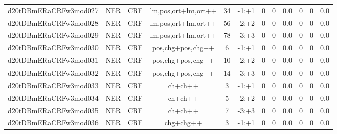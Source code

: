 \documentclass[a4paper]{article}
\begin{document}
\begin{landscape}
\begin{center}
\begin{tabular}{ |c|c|c|c|c|c|c|c|c|c|c|c|}
 
 	
 	\small{ d20tDBmERaCRFw3mod027 } & \small{ NER} & \small{  CRF }  & lm,pos,ort+lm,ort++  &  34 &  \small{  -1:+1 }  &  0 & 0 & 0.0  &  0 & 0 & 0.0 \\
 	

 
 	
 	\small{ d20tDBmERaCRFw3mod028 } & \small{ NER} & \small{  CRF }  & lm,pos,ort+lm,ort++  &  56 &  \small{  -2:+2 }  &  0 & 0 & 0.0  &  0 & 0 & 0.0 \\
 	

 
 	
 	\small{ d20tDBmERaCRFw3mod029 } & \small{ NER} & \small{  CRF }  & lm,pos,ort+lm,ort++  &  78 &  \small{  -3:+3 }  &  0 & 0 & 0.0  &  0 & 0 & 0.0 \\
 	

 
 	
 	\small{ d20tDBmERaCRFw3mod030 } & \small{ NER} & \small{  CRF }  & pos,chg+pos,chg++  &  6 &  \small{  -1:+1 }  &  0 & 0 & 0.0  &  0 & 0 & 0.0 \\
 	

 
 	
 	\small{ d20tDBmERaCRFw3mod031 } & \small{ NER} & \small{  CRF }  & pos,chg+pos,chg++  &  10 &  \small{  -2:+2 }  &  0 & 0 & 0.0  &  0 & 0 & 0.0 \\
 	

 
 	
 	\small{ d20tDBmERaCRFw3mod032 } & \small{ NER} & \small{  CRF }  & pos,chg+pos,chg++  &  14 &  \small{  -3:+3 }  &  0 & 0 & 0.0  &  0 & 0 & 0.0 \\
 	

 
 	
 	\small{ d20tDBmERaCRFw3mod033 } & \small{ NER} & \small{  CRF }  & ch+ch++  &  3 &  \small{  -1:+1 }  &  0 & 0 & 0.0  &  0 & 0 & 0.0 \\
 	

 
 	
 	\small{ d20tDBmERaCRFw3mod034 } & \small{ NER} & \small{  CRF }  & ch+ch++  &  5 &  \small{  -2:+2 }  &  0 & 0 & 0.0  &  0 & 0 & 0.0 \\
 	

 
 	
 	\small{ d20tDBmERaCRFw3mod035 } & \small{ NER} & \small{  CRF }  & ch+ch++  &  7 &  \small{  -3:+3 }  &  0 & 0 & 0.0  &  0 & 0 & 0.0 \\
 	

 
 	
 	\small{ d20tDBmERaCRFw3mod036 } & \small{ NER} & \small{  CRF }  & chg+chg++  &  3 &  \small{  -1:+1 }  &  0 & 0 & 0.0  &  0 & 0 & 0.0 \\
 	


\end{tabular}
\end{center}
\end{landscape}
\end{document}

